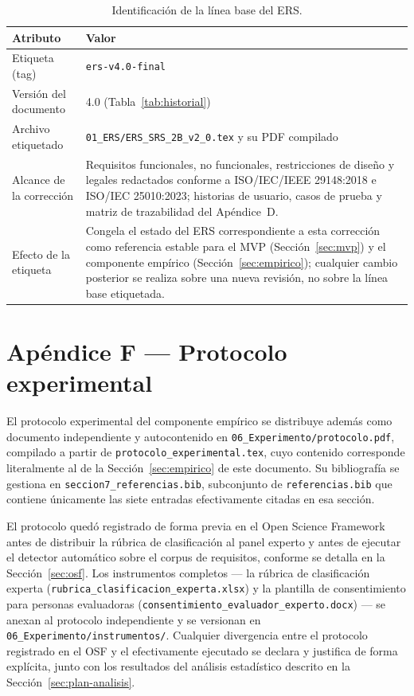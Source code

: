 \documentclass[journal,onecolumn]{IEEEtran}
\begin{document}
	\begin{table}[H]
		\centering
		\caption{Identificación de la línea base del ERS.}
		\label{tab:linea-base-ers}
		\small
		\begin{tabularx}{\textwidth}{@{}p{4cm} X@{}}
			\toprule
			\textbf{Atributo} & \textbf{Valor} \\
			\midrule
			Etiqueta (tag) & \texttt{ers-v4.0-final} \\
			Versión del documento & 4.0 (Tabla~\ref{tab:historial}) \\
			Archivo etiquetado & \texttt{01\_ERS/ERS\_SRS\_2B\_v2\_0.tex} y su PDF compilado \\
			Alcance de la corrección & Requisitos funcionales, no funcionales, restricciones de diseño y legales redactados conforme a ISO/IEC/IEEE 29148:2018 e ISO/IEC 25010:2023; historias de usuario, casos de prueba y matriz de trazabilidad del Apéndice~D. \\
			Efecto de la etiqueta & Congela el estado del ERS correspondiente a esta corrección como referencia estable para el MVP (Sección~\ref{sec:mvp}) y el componente empírico (Sección~\ref{sec:empirico}); cualquier cambio posterior se realiza sobre una nueva revisión, no sobre la línea base etiquetada. \\
			\bottomrule
		\end{tabularx}
	\end{table}

	\section*{Apéndice F --- Protocolo experimental}
	\label{ap:protocolo}
	
	El protocolo experimental del componente empírico se distribuye además como
	documento independiente y autocontenido en
	\texttt{06\_Experimento/protocolo.pdf}, compilado a partir de
	\texttt{protocolo\_experimental.tex}, cuyo contenido corresponde
	literalmente al de la Sección~\ref{sec:empirico} de este documento. Su
	bibliografía se gestiona en \texttt{seccion7\_referencias.bib}, subconjunto
	de \texttt{referencias.bib} que contiene únicamente las siete entradas
	efectivamente citadas en esa sección.
	
	El protocolo quedó registrado de forma previa en el Open Science Framework
	\cite{nosek2018} antes de distribuir la rúbrica de clasificación al panel
	experto y antes de ejecutar el detector automático sobre el corpus de
	requisitos, conforme se detalla en la Sección~\ref{sec:osf}. Los
	instrumentos completos --- la rúbrica de clasificación experta
	(\texttt{rubrica\_clasificacion\_experta.xlsx}) y la plantilla de
	consentimiento para personas evaluadoras
	(\texttt{consentimiento\_evaluador\_experto.docx}) --- se anexan al
	protocolo independiente y se versionan en
	\texttt{06\_Experimento/instrumentos/}. Cualquier divergencia entre el
	protocolo registrado en el OSF y el efectivamente ejecutado se declara y
	justifica de forma explícita, junto con los resultados
	del análisis estadístico descrito en la Sección~\ref{sec:plan-analisis}.
	
\end{document}
